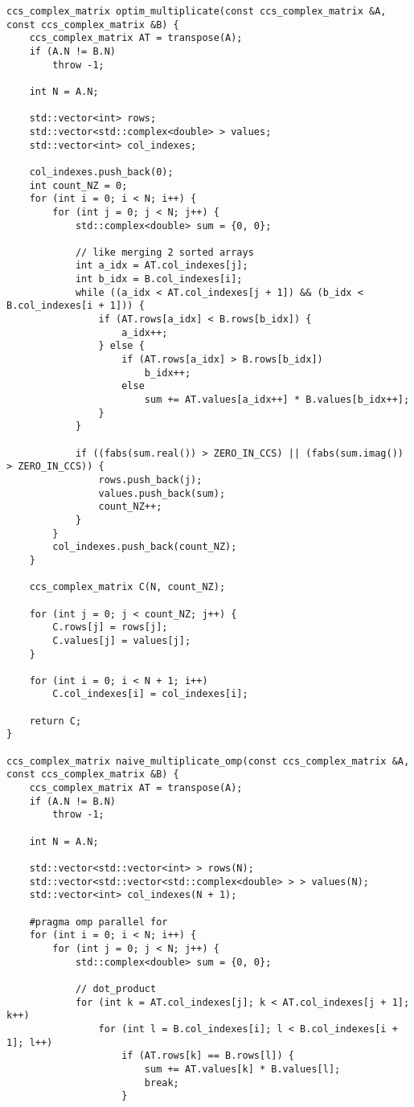 \documentclass{report}
\begin{document}
\begin{itemize}
\begin{itemize}
\begin{lstlisting}
ccs_complex_matrix optim_multiplicate(const ccs_complex_matrix &A, const ccs_complex_matrix &B) {
    ccs_complex_matrix AT = transpose(A);
    if (A.N != B.N)
        throw -1;

    int N = A.N;

    std::vector<int> rows;
    std::vector<std::complex<double> > values;
    std::vector<int> col_indexes;

    col_indexes.push_back(0);
    int count_NZ = 0;
    for (int i = 0; i < N; i++) {
        for (int j = 0; j < N; j++) {
            std::complex<double> sum = {0, 0};

            // like merging 2 sorted arrays
            int a_idx = AT.col_indexes[j];
            int b_idx = B.col_indexes[i];
            while ((a_idx < AT.col_indexes[j + 1]) && (b_idx < B.col_indexes[i + 1])) {
                if (AT.rows[a_idx] < B.rows[b_idx]) {
                    a_idx++;
                } else {
                    if (AT.rows[a_idx] > B.rows[b_idx])
                        b_idx++;
                    else
                        sum += AT.values[a_idx++] * B.values[b_idx++];
                }
            }

            if ((fabs(sum.real()) > ZERO_IN_CCS) || (fabs(sum.imag()) > ZERO_IN_CCS)) {
                rows.push_back(j);
                values.push_back(sum);
                count_NZ++;
            }
        }
        col_indexes.push_back(count_NZ);
    }

    ccs_complex_matrix C(N, count_NZ);

    for (int j = 0; j < count_NZ; j++) {
        C.rows[j] = rows[j];
        C.values[j] = values[j];
    }

    for (int i = 0; i < N + 1; i++)
        C.col_indexes[i] = col_indexes[i];

    return C;
}

ccs_complex_matrix naive_multiplicate_omp(const ccs_complex_matrix &A, const ccs_complex_matrix &B) {
    ccs_complex_matrix AT = transpose(A);
    if (A.N != B.N)
        throw -1;

    int N = A.N;

    std::vector<std::vector<int> > rows(N);
    std::vector<std::vector<std::complex<double> > > values(N);
    std::vector<int> col_indexes(N + 1);

    #pragma omp parallel for
    for (int i = 0; i < N; i++) {
        for (int j = 0; j < N; j++) {
            std::complex<double> sum = {0, 0};

            // dot_product
            for (int k = AT.col_indexes[j]; k < AT.col_indexes[j + 1]; k++)
                for (int l = B.col_indexes[i]; l < B.col_indexes[i + 1]; l++)
                    if (AT.rows[k] == B.rows[l]) {
                        sum += AT.values[k] * B.values[l];
                        break;
                    }


\end{lstlisting}
\end{itemize}
\end{itemize}
\end{document}
